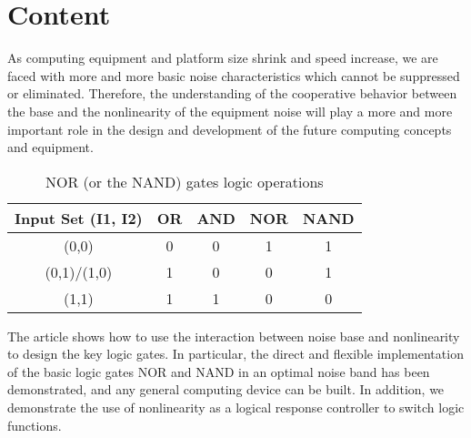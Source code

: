 \documentclass[30pt,twocolumn,letterpaper]{article}
\begin{document}
\section{Content}
As computing equipment and platform size shrink and speed increase, we are faced with more and more basic noise characteristics which cannot be suppressed or eliminated. Therefore, the understanding of the cooperative behavior between the base and the nonlinearity of the equipment noise will play a more and more important role in the design and development of the future computing concepts and equipment\cite{Murali2009Realization}.\\
\begin{table}
\begin{center}
\begin{tabular}{ccccc}
\toprule
 Input Set (I1, I2)& OR  &AND&NOR&NAND\\
\midrule
(0,0)&0&0   &1  &1\\
(0,1)/(1,0)&1  &0  &0   &1\\
(1,1)   &1  &1    &0    &0\\
 \bottomrule
\end{tabular}
\end{center}
\caption{NOR (or the NAND) gates logic operations}
\end{table}
\par
The article shows how to use the interaction between noise base and nonlinearity to design the key logic gates. In particular, the direct and flexible implementation of the basic logic gates NOR and NAND in an optimal noise band has been demonstrated, and any general computing device can be built. In addition, we demonstrate the use of nonlinearity as a logical response controller to switch logic functions\cite{Murali2009Reliable}.\\
{\small


}
\end{document}

